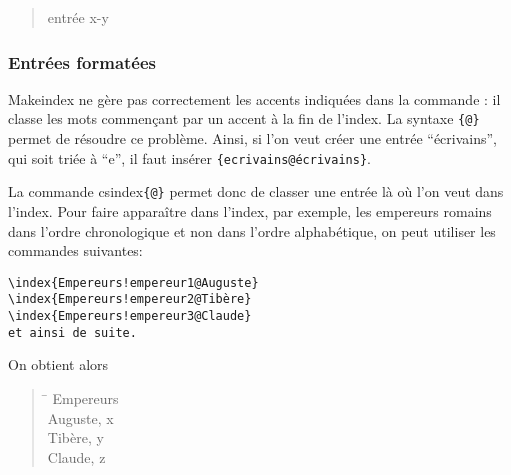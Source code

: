 \begin{quotation}
entrée x-y
\end{quotation}


\subsubsection{Entrées formatées}

Makeindex ne gère pas correctement les accents indiquées dans la commande  : il classe les mots commençant par un accent à la fin de l'index. La syntaxe \verb|{|\verb|@|\verb+}+ permet de résoudre ce problème. Ainsi, si l'on veut créer une entrée \enquote{écrivains}, qui soit triée à \enquote{e}, il faut insérer \verb|{ecrivains@écrivains}|.

La commande cs{index}\verb|{|\verb|@|\verb+}+ permet donc de classer une entrée là où l'on veut dans l'index. Pour faire apparaître dans l'index, par exemple, les empereurs romains dans l'ordre chronologique et non dans l'ordre alphabétique, on peut utiliser les commandes suivantes:

\begin{verbatim}
\index{Empereurs!empereur1@Auguste}
\index{Empereurs!empereur2@Tibère}
\index{Empereurs!empereur3@Claude}
et ainsi de suite. 
\end{verbatim}

On obtient alors
\begin{quotation}
\begin{tabbing}
\hspace{0,5cm} \= \kill
Empereurs\\
\> Auguste, x\\
\> Tibère, y\\
\> Claude, z \\

\end{tabbing}
\end{quotation}

